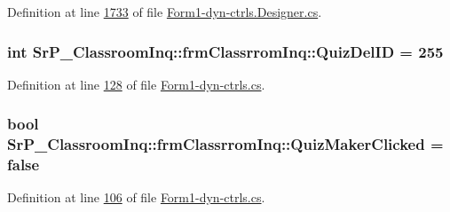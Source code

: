 \-Definition at line \hyperlink{_form1-dyn-ctrls_8_designer_8cs_source_l01733}{1733} of file \hyperlink{_form1-dyn-ctrls_8_designer_8cs_source}{\-Form1-\/dyn-\/ctrls.\-Designer.\-cs}.

\hypertarget{class_sr_p___classroom_inq_1_1frm_classrrom_inq_a2221a860fdb3bc2837b3ca3c0cee182c}{
\subsubsection[{\-Quiz\-Del\-I\-D}]{\setlength{\rightskip}{0pt plus 5cm}int {\bf \-Sr\-P\-\_\-\-Classroom\-Inq\-::frm\-Classrrom\-Inq\-::\-Quiz\-Del\-I\-D} = 255}}
\label{class_sr_p___classroom_inq_1_1frm_classrrom_inq_a2221a860fdb3bc2837b3ca3c0cee182c}


\-Definition at line \hyperlink{_form1-dyn-ctrls_8cs_source_l00128}{128} of file \hyperlink{_form1-dyn-ctrls_8cs_source}{\-Form1-\/dyn-\/ctrls.\-cs}.

\hypertarget{class_sr_p___classroom_inq_1_1frm_classrrom_inq_a80b43512315939f073e08cfea00ce796}{
\subsubsection[{\-Quiz\-Maker\-Clicked}]{\setlength{\rightskip}{0pt plus 5cm}bool {\bf \-Sr\-P\-\_\-\-Classroom\-Inq\-::frm\-Classrrom\-Inq\-::\-Quiz\-Maker\-Clicked} = false}}
\label{class_sr_p___classroom_inq_1_1frm_classrrom_inq_a80b43512315939f073e08cfea00ce796}


\-Definition at line \hyperlink{_form1-dyn-ctrls_8cs_source_l00106}{106} of file \hyperlink{_form1-dyn-ctrls_8cs_source}{\-Form1-\/dyn-\/ctrls.\-cs}.

